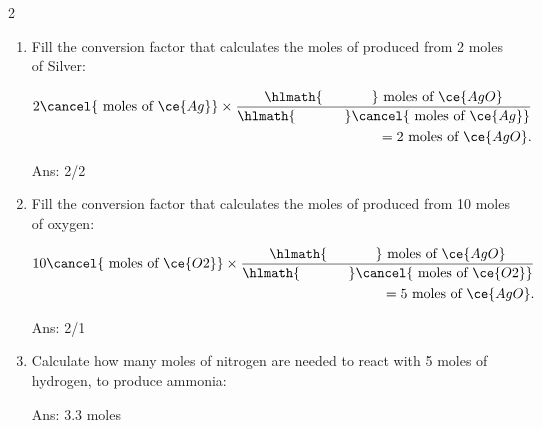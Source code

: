 \documentclass[main.tex]{subfiles}
\begin{document}
\begin{multicols*}{2}
\begin{enumerate}
\item Fill the conversion factor that calculates the moles of  produced from 2 moles of Silver:
\begin{center}\end{center}
 \begin{equation*}\begin{split}
2\cancel{\text{ moles of }\ce{Ag}} \times \dfrac{\hlmath{\hspace{35pt}}\text{ moles of }\ce{AgO}}{\hlmath{\hspace{35pt}}\cancel{\text{ moles of }\ce{Ag}}}\\
=2\text{ moles of }\ce{AgO}.
\end{split}\end{equation*}
\begin{flushright}\small Ans:  2/2  \end{flushright}



\item Fill the conversion factor that calculates the moles of  produced from 10 moles of oxygen:
\begin{center}\end{center}
 \begin{equation*}\begin{split}
10\cancel{\text{ moles of }\ce{O2}} \times \dfrac{\hlmath{\hspace{35pt}}\text{ moles of }\ce{AgO}}{\hlmath{\hspace{35pt}}\cancel{\text{ moles of }\ce{O2}}}\\
=5\text{ moles of }\ce{AgO}.
\end{split}\end{equation*}
\begin{flushright}\small Ans: 2/1   \end{flushright}


\item Calculate how many moles of nitrogen are needed to react with 5 moles of hydrogen, to produce ammonia:
\begin{center}  \end{center}
\begin{flushright}\small Ans: 3.3 moles    \end{flushright}







\end{enumerate}
\end{multicols*}
\end{document}
